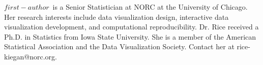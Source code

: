 \documentclass{IEEEcsmag}
\begin{document}
% 
% 
% 
% 
% 
% 
% 
% 
% 
% 
% 


\begin{IEEEbiography}{$first-author$}{\,} is a Senior Statistician at NORC at the University of Chicago. Her research interests include data visualization design, interactive data visualization development, and computational reproducibility. Dr. Rice received a Ph.D. in Statistics from Iowa State University. She is a member of the American Statistical Association and the Data Visualization Society. Contact her at rice-kiegan@norc.org.%
\end{IEEEbiography}
\end{document}
